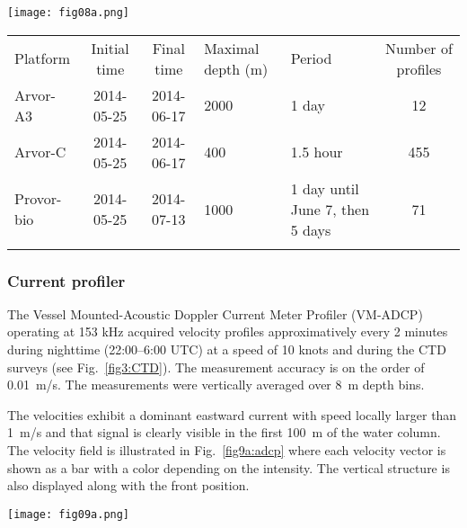\documentclass[essd]{copernicus}
\begin{document}
\begin{figure*}[h]
\texttt{[image: fig08a.png]}
\caption{Profiling floats trajectories (top-left panel) and salinity from May 25 to June 15, 2014. \label{fig8:argofloats}}
\end{figure*}


\begin{table*}[htpb]
\caption{Characteristics of the profiling floats.\label{tab:argofloats}}
\begin{tabular}{lccllc}
\tophline
Platform 			& Initial time	& Final time	& Maximal depth (m)		& Period & Number of profiles \\
\middlehline
Arvor-A3			& 2014-05-25	& 2014-06-17	& 2000		& 1 day 	& 12 							\\ 
Arvor-C				& 2014-05-25	& 2014-06-17	& 400		& 1.5 hour	& 455				\\ 
Provor-bio			& 2014-05-25	& 2014-07-13	& 1000		& 1 day until June 7, then 5 days	& 71	\\ 
\bottomhline
\end{tabular}
\end{table*}

\subsubsection{Current profiler\label{sec:adcp}}

The Vessel Mounted-Acoustic Doppler Current Meter Profiler (VM-ADCP) operating at 153 kHz acquired velocity profiles approximatively every 2 minutes during nighttime (22:00--6:00 UTC) at a speed of 10 knots and during the CTD surveys (see Fig.~\ref{fig3:CTD}). The measurement accuracy is on the order of 0.01~m/s. The measurements were vertically averaged over 8~m depth bins.

The velocities exhibit a dominant eastward current with speed locally larger than 1~m/s and that signal is clearly visible in the first 100~m of the water column. The velocity field is illustrated in Fig.~\ref{fig9a:adcp} where each velocity vector is shown as a bar with a color depending on the intensity. The vertical structure is also displayed along with the front position.

\begin{figure*}[h]
\texttt{[image: fig09a.png]}
\caption{Velocity field obtained with the ADCP at a 40~m depth (left panel) and sections of zonal velocity on May 26 (S1) and 27 (S2). The locations of the sections are indicated by dashed rectangles on the map. Only data with a quality flag equal to 1 (good data) are represented\label{fig9a:adcp}}
\end{figure*}
\end{document}
